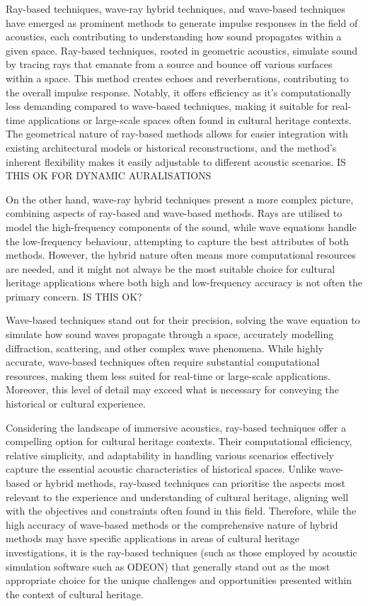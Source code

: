 Ray-based techniques, wave-ray hybrid techniques, and wave-based techniques have emerged as prominent methods to generate impulse responses in the field of acoustics, each contributing to understanding how sound propagates within a given space. Ray-based techniques, rooted in geometric acoustics, simulate sound by tracing rays that emanate from a source and bounce off various surfaces within a space. This method creates echoes and reverberations, contributing to the overall impulse response. Notably, it offers efficiency as it's computationally less demanding compared to wave-based techniques, making it suitable for real-time applications or large-scale spaces often found in cultural heritage contexts. The geometrical nature of ray-based methods allows for easier integration with existing architectural models or historical reconstructions, and the method's inherent flexibility makes it easily adjustable to different acoustic scenarios. IS THIS OK FOR DYNAMIC AURALISATIONS

On the other hand, wave-ray hybrid techniques present a more complex picture, combining aspects of ray-based and wave-based methods. Rays are utilised to model the high-frequency components of the sound, while wave equations handle the low-frequency behaviour, attempting to capture the best attributes of both methods. However, the hybrid nature often means more computational resources are needed, and it might not always be the most suitable choice for cultural heritage applications where both high and low-frequency accuracy is not often the primary concern. IS THIS OK?

Wave-based techniques stand out for their precision, solving the wave equation to simulate how sound waves propagate through a space, accurately modelling diffraction, scattering, and other complex wave phenomena. While highly accurate, wave-based techniques often require substantial computational resources, making them less suited for real-time or large-scale applications. Moreover, this level of detail may exceed what is necessary for conveying the historical or cultural experience.

Considering the landscape of immersive acoustics, ray-based techniques offer a compelling option for cultural heritage contexts. Their computational efficiency, relative simplicity, and adaptability in handling various scenarios effectively capture the essential acoustic characteristics of historical spaces. Unlike wave-based or hybrid methods, ray-based techniques can prioritise the aspects most relevant to the experience and understanding of cultural heritage, aligning well with the objectives and constraints often found in this field. Therefore, while the high accuracy of wave-based methods or the comprehensive nature of hybrid methods may have specific applications in areas of cultural heritage investigations, it is the ray-based techniques (such as those employed by acoustic simulation software such as ODEON) that generally stand out as the most appropriate choice for the unique challenges and opportunities presented within the context of cultural heritage.

